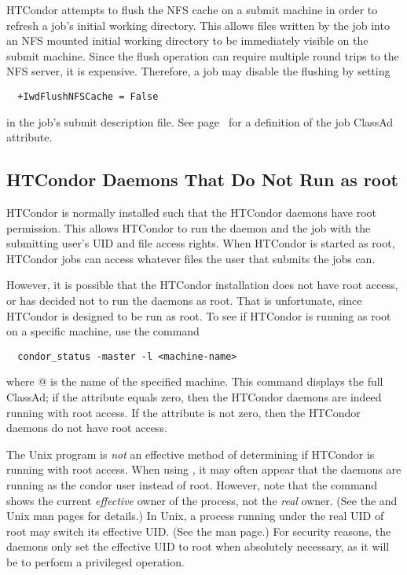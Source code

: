 HTCondor attempts to flush the NFS cache on a submit machine in order to
refresh a job's initial working directory.
This allows files written by the job into an NFS mounted 
initial working directory to be immediately visible on the submit machine.
Since the flush operation can require multiple round trips
to the NFS server, it is expensive.
Therefore, a job may disable the flushing by setting
\begin{verbatim}
  +IwdFlushNFSCache = False
\end{verbatim}
in the job's submit description file.
See page~\pageref{IwdFlushNFSCache-job-attribute} for a definition
of the job ClassAd attribute.

\subsection{HTCondor Daemons That Do Not Run as root}

HTCondor is normally installed such that the HTCondor daemons have root
permission.
This allows HTCondor to run the  
daemon and
the job with the submitting user's UID and file access rights.
When HTCondor
is started as root, HTCondor jobs can access whatever files the
user that submits the jobs can.

However, it is possible that the HTCondor installation 
does not have root access, or
has decided not to run the daemons as root.
That is unfortunate,
since HTCondor is designed to be run as root.
To see if HTCondor is
running as root on a specific machine, use the command
\begin{verbatim}
  condor_status -master -l <machine-name>
\end{verbatim}

where @ is the name of the specified machine.
This command displays the full  ClassAd; if the
attribute  equals zero,
then the HTCondor daemons are indeed
running with root access.  If the
 attribute is not zero, then the HTCondor daemons do not have
root access.

\Note The Unix program 
is \emph{not} an effective
method of determining if HTCondor is running with root access.
When using ,
it may often appear that the daemons are
running as the condor user instead of root.
However, note that the 
command shows the current \emph{effective} owner of the
process, not the \emph{real} owner.  (See the  and
 Unix man pages for details.)  In Unix, a process
running under the real UID of root may switch its effective UID.
(See the  man page.)
For security reasons, the daemons
only set the effective UID to root when absolutely necessary,
as it will be to perform a privileged operation.

